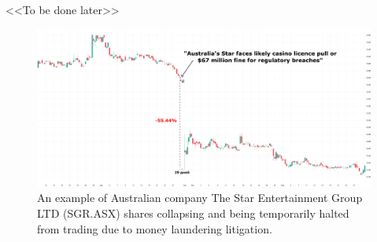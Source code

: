 <<To be done later>>

\begin{figure}[H]
    \centering
    \includegraphics[width=1\linewidth]{img/star_entertainment.png}
    \caption{An example of Australian company The Star Entertainment Group LTD (SGR.ASX) shares
    collapsing and being temporarily halted from trading due to money laundering litigation.}
    \label{fig:star_entertainment}
\end{figure}